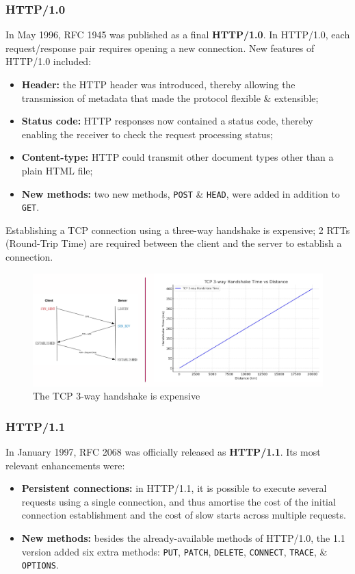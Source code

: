 \documentclass[a4paper,11pt]{article}
\begin{document}
\subsubsection{HTTP/1.0}
In May 1996, RFC 1945 was published as a final \textbf{HTTP/1.0}.
In HTTP/1.0, each request/response pair requires opening a new connection.
New features of HTTP/1.0 included:
\begin{itemize}
    \item   \textbf{Header:} the HTTP header was introduced, thereby allowing the transmission of metadata that made the protocol flexible \& extensible;
    \item   \textbf{Status code:} HTTP responses now contained a status code, thereby enabling the receiver to check the request processing status;
    \item   \textbf{Content-type:} HTTP could transmit other document types other than a plain HTML file;
    \item   \textbf{New methods:} two new methods, \verb|POST| \& \verb|HEAD|, were added in addition to \verb|GET|.
\end{itemize}

Establishing a TCP connection using a three-way handshake is expensive;
2 RTTs (Round-Trip Time) are required between the client and the server to establish a connection.

\begin{figure}[H]
    \centering
    \includegraphics[width=\textwidth]{./images/tcpthreesome.png}
    \caption{The TCP 3-way handshake is expensive}
\end{figure}

\subsubsection{HTTP/1.1}
In January 1997, RFC 2068 was officially released as \textbf{HTTP/1.1}.
Its most relevant enhancements were:
\begin{itemize}
    \item   \textbf{Persistent connections:} in HTTP/1.1, it is possible to execute several requests using a single connection, and thus amortise the cost of the initial connection establishment and the cost of slow starts across multiple requests.
    \item   \textbf{New methods:} besides the already-available methods of HTTP/1.0, the 1.1 version added six extra methods: \verb|PUT|, \verb|PATCH|, \verb|DELETE|, \verb|CONNECT|, \verb|TRACE|, \& \verb|OPTIONS|.
\end{itemize}
\end{document}
